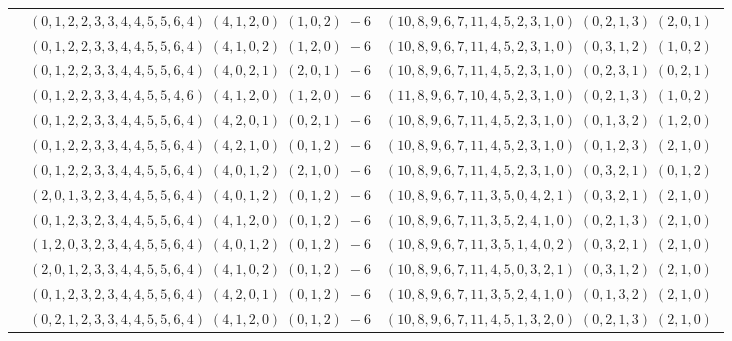 \documentclass[11pt]{article}
\begin{document}
\begin{longtable}[l]{|c|c|c|}
 \cline{2-3} 
 & $(0 ,1 ,2 ,2 ,3 ,3 ,4 ,4 ,5 ,5 ,6 ,4) \;(4 ,1 ,2 ,0) \;(1 ,0 ,2) \;-6$ & $(10 ,8 ,9 ,6 ,7 ,11 ,4 ,5 ,2 ,3 ,1 ,0) \;(0 ,2 ,1 ,3) \;(2 ,0 ,1) \;$\\ 
 \cline{2-3} 
 & $(0 ,1 ,2 ,2 ,3 ,3 ,4 ,4 ,5 ,5 ,6 ,4) \;(4 ,1 ,0 ,2) \;(1 ,2 ,0) \;-6$ & $(10 ,8 ,9 ,6 ,7 ,11 ,4 ,5 ,2 ,3 ,1 ,0) \;(0 ,3 ,1 ,2) \;(1 ,0 ,2) \;$\\ 
 \cline{2-3} 
 & $(0 ,1 ,2 ,2 ,3 ,3 ,4 ,4 ,5 ,5 ,6 ,4) \;(4 ,0 ,2 ,1) \;(2 ,0 ,1) \;-6$ & $(10 ,8 ,9 ,6 ,7 ,11 ,4 ,5 ,2 ,3 ,1 ,0) \;(0 ,2 ,3 ,1) \;(0 ,2 ,1) \;$\\ 
 \cline{2-3} 
 & $(0 ,1 ,2 ,2 ,3 ,3 ,4 ,4 ,5 ,5 ,4 ,6) \;(4 ,1 ,2 ,0) \;(1 ,2 ,0) \;-6$ & $(11 ,8 ,9 ,6 ,7 ,10 ,4 ,5 ,2 ,3 ,1 ,0) \;(0 ,2 ,1 ,3) \;(1 ,0 ,2) \;$\\ 
 \cline{2-3} 
 & $(0 ,1 ,2 ,2 ,3 ,3 ,4 ,4 ,5 ,5 ,6 ,4) \;(4 ,2 ,0 ,1) \;(0 ,2 ,1) \;-6$ & $(10 ,8 ,9 ,6 ,7 ,11 ,4 ,5 ,2 ,3 ,1 ,0) \;(0 ,1 ,3 ,2) \;(1 ,2 ,0) \;$\\ 
 \cline{2-3} 
 & $(0 ,1 ,2 ,2 ,3 ,3 ,4 ,4 ,5 ,5 ,6 ,4) \;(4 ,2 ,1 ,0) \;(0 ,1 ,2) \;-6$ & $(10 ,8 ,9 ,6 ,7 ,11 ,4 ,5 ,2 ,3 ,1 ,0) \;(0 ,1 ,2 ,3) \;(2 ,1 ,0) \;$\\ 
 \cline{2-3} 
 & $(0 ,1 ,2 ,2 ,3 ,3 ,4 ,4 ,5 ,5 ,6 ,4) \;(4 ,0 ,1 ,2) \;(2 ,1 ,0) \;-6$ & $(10 ,8 ,9 ,6 ,7 ,11 ,4 ,5 ,2 ,3 ,1 ,0) \;(0 ,3 ,2 ,1) \;(0 ,1 ,2) \;$\\ 
 \cline{2-3} 
 & $(2 ,0 ,1 ,3 ,2 ,3 ,4 ,4 ,5 ,5 ,6 ,4) \;(4 ,0 ,1 ,2) \;(0 ,1 ,2) \;-6$ & $(10 ,8 ,9 ,6 ,7 ,11 ,3 ,5 ,0 ,4 ,2 ,1) \;(0 ,3 ,2 ,1) \;(2 ,1 ,0) \;$\\ 
 \cline{2-3} 
 & $(0 ,1 ,2 ,3 ,2 ,3 ,4 ,4 ,5 ,5 ,6 ,4) \;(4 ,1 ,2 ,0) \;(0 ,1 ,2) \;-6$ & $(10 ,8 ,9 ,6 ,7 ,11 ,3 ,5 ,2 ,4 ,1 ,0) \;(0 ,2 ,1 ,3) \;(2 ,1 ,0) \;$\\ 
 \cline{2-3} 
 & $(1 ,2 ,0 ,3 ,2 ,3 ,4 ,4 ,5 ,5 ,6 ,4) \;(4 ,0 ,1 ,2) \;(0 ,1 ,2) \;-6$ & $(10 ,8 ,9 ,6 ,7 ,11 ,3 ,5 ,1 ,4 ,0 ,2) \;(0 ,3 ,2 ,1) \;(2 ,1 ,0) \;$\\ 
 \cline{2-3} 
 & $(2 ,0 ,1 ,2 ,3 ,3 ,4 ,4 ,5 ,5 ,6 ,4) \;(4 ,1 ,0 ,2) \;(0 ,1 ,2) \;-6$ & $(10 ,8 ,9 ,6 ,7 ,11 ,4 ,5 ,0 ,3 ,2 ,1) \;(0 ,3 ,1 ,2) \;(2 ,1 ,0) \;$\\ 
 \cline{2-3} 
 & $(0 ,1 ,2 ,3 ,2 ,3 ,4 ,4 ,5 ,5 ,6 ,4) \;(4 ,2 ,0 ,1) \;(0 ,1 ,2) \;-6$ & $(10 ,8 ,9 ,6 ,7 ,11 ,3 ,5 ,2 ,4 ,1 ,0) \;(0 ,1 ,3 ,2) \;(2 ,1 ,0) \;$\\ 
 \cline{2-3} 
 & $(0 ,2 ,1 ,2 ,3 ,3 ,4 ,4 ,5 ,5 ,6 ,4) \;(4 ,1 ,2 ,0) \;(0 ,1 ,2) \;-6$ & $(10 ,8 ,9 ,6 ,7 ,11 ,4 ,5 ,1 ,3 ,2 ,0) \;(0 ,2 ,1 ,3) \;(2 ,1 ,0) \;$\\ 

\end{longtable}
\end{document}
